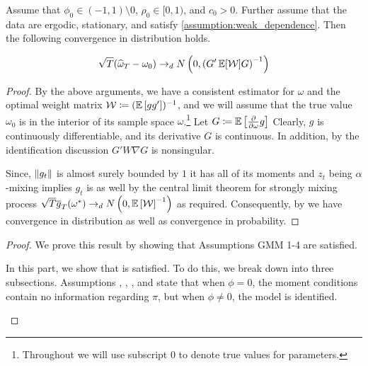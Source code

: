 \documentclass[11pt, letterpaper, twoside, final]{article}
\begin{document}
\begin{appendices}
\begin{theorem}
    Assume that $\phi_0  \in (-1,1) \setminus 0$, $\rho_0 \in [0,1)$, and $c_0 > 0$. 
    Further assume that the data are ergodic, stationary, and satisfy \cref{assumption:weak_dependence}.
    Then the following convergence in distribution holds.

    \begin{equation}
    \sqrt{T} (\widehat{\omega}_T - \omega_0) \dto \N\left(0, \left(G' \E[\W] G\right)^{-1}\right)
    \end{equation}
\end{theorem}

\begin{proof}

    By the above arguments, we have a consistent estimator for $\omega$ and the optimal weight matrix $\W \coloneqq
    (\E\left[g g'\right])^{-1}$, and we will assume that the true value $\omega_{0}$ is in the interior of its
    sample space $\omega$.\footnote{Throughout we will use subscript \num{0}  to denote true values for parameters.}
    Let $G \coloneqq \E\left[\frac{\partial}{\partial \omega} \popmom \right]$ Clearly, $g$ is continuously
    differentiable, and its derivative $G$ is continuous.
    In addition, by the identification discussion $G' W \nabla G$ is nonsingular.
    

    Since, $\norm*{g_t}$ is almost surely bounded by $1$ it has all of its moments and $z_t$ being $\alpha$-mixing
    implies $g_t$ is as well by the central limit theorem for strongly mixing process $\sqrt{T} \sampmom(\omega^{*})
    \dto \N\left(0, \E\left[\W\right]^{-1}\right)$ as required. 
    Consequently, by \textcite[theorem 3.2]{newey1994large} we have convergence in distribution as well as
    convergence in probability.
    

\end{proof}


\InferenceWeakID*

\begin{proof}
We prove this result by showing that Assumptions GMM 1-4 are satisfied.

\begin{proofpart}
    \label{part:main_theorem_proof_part1}
    In this part, we show that  is satisfied. 
    To do this, we break   down into three subsections.
    Assumptions , , , and  state
    that when $\phi = 0$, the moment conditions contain no information regarding $\pi$, but when $\phi \neq 0$,
    the model is identified.
    

\end{proofpart}
\end{proof}
\end{appendices}
\end{document}
